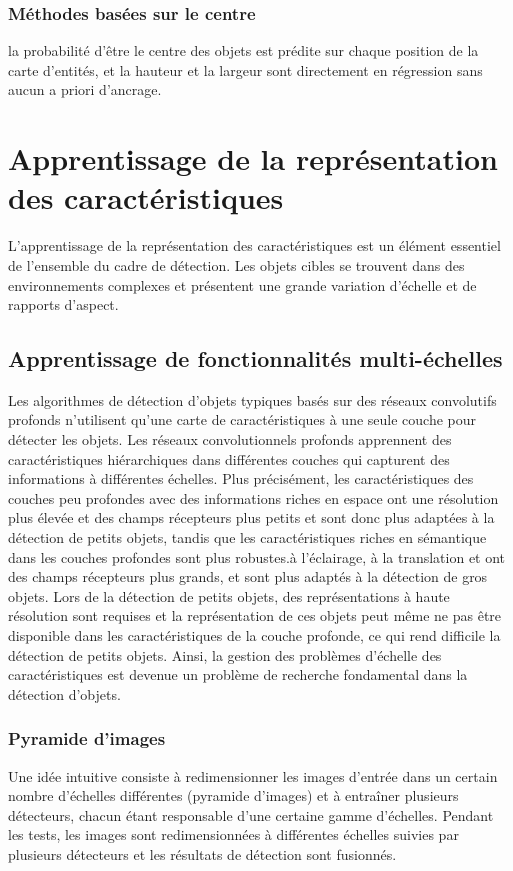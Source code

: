      \subsubsection{Méthodes basées sur le centre} la probabilité d'être le centre des objets est prédite sur chaque position de la carte d'entités, et la hauteur et la largeur sont directement en régression sans aucun a priori d'ancrage.

\section{Apprentissage de la représentation des caractéristiques}
L'apprentissage de la représentation des caractéristiques est un élément essentiel de l'ensemble du cadre de détection. Les objets cibles se trouvent dans des environnements complexes et présentent une grande variation d'échelle et de rapports d'aspect.

     \subsection{Apprentissage de fonctionnalités multi-échelles}
     Les algorithmes de détection d'objets typiques basés sur des réseaux convolutifs profonds n'utilisent qu'une carte de caractéristiques à une seule couche pour détecter les objets. Les réseaux convolutionnels profonds apprennent des caractéristiques hiérarchiques dans différentes couches qui capturent des informations à différentes échelles. Plus précisément, les caractéristiques des couches peu profondes avec des informations riches en espace ont une résolution plus élevée et des champs récepteurs plus petits et sont donc plus adaptées à la détection de petits objets, tandis que les caractéristiques riches en sémantique dans les couches profondes sont plus robustes.à l'éclairage, à la translation et ont des champs récepteurs plus grands, et sont plus adaptés à la détection de gros objets. Lors de la détection de petits objets, des représentations à haute résolution sont requises et la représentation de ces objets peut même ne pas être disponible dans les caractéristiques de la couche profonde, ce qui rend difficile la détection de petits objets. Ainsi, la gestion des problèmes d'échelle des caractéristiques est devenue un problème de recherche fondamental dans la détection d'objets.
     \subsubsection{Pyramide d'images} Une idée intuitive consiste à redimensionner les images d'entrée dans un certain nombre d'échelles différentes (pyramide d'images) et à entraîner plusieurs détecteurs, chacun étant responsable d'une certaine gamme d'échelles. Pendant les tests, les images sont redimensionnées à différentes échelles suivies par plusieurs détecteurs et les résultats de détection sont fusionnés.
